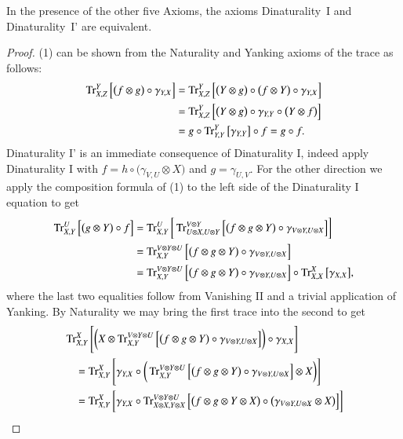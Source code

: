 \documentclass[12pt,oneside,article,draft]{memoir}
\begin{document}
\begin{enumerate}
{\begin{proposition}
\begin{enumerate}
\begin{description}
 \end{description}
 In the presence of the other five Axioms, the axioms Dinaturality~I and Dinaturality~I' are equivalent.
\end{enumerate}
\end{proposition}
\begin{proof}
 (1) can be shown from the Naturality and Yanking axioms of the trace as follows:
 \begin{align*}
  \operatorname{Tr}^Y_{X,Z}\Big[\big(f\otimes g\big)\circ\gamma_{Y,X}\Big]
  &=\operatorname{Tr}^Y_{X,Z}\Big[\big(Y\otimes g\big)\circ\big(f\otimes Y\big)\circ\gamma_{Y,X}\Big]\\
  &=\operatorname{Tr}^Y_{X,Z}\Big[\big(Y\otimes g\big)\circ\gamma_{Y,Y}\circ\big(Y\otimes f\big)\Big]\\
  &=g\circ\operatorname{Tr}^Y_{Y,Y}\big[\gamma_{Y,Y}\big]\circ f=g\circ f.
 \end{align*}
 Dinaturality I' is an immediate consequence of Dinaturality I, indeed apply Dinaturality I with $f=h\circ\big(\gamma_{V,U}\otimes X\big)$ and $g=\gamma_{U,V}$.
 For the other direction we apply the composition formula of (1) to the left side of the Dinaturality I equation to get
 \begin{align*}
  \operatorname{Tr}^U_{X,Y}\Big[\big(g\otimes Y\big)\circ f\Big]
  &=\operatorname{Tr}^U_{X,Y}\bigg[\operatorname{Tr}^{V\otimes Y}_{U\otimes X,U\otimes Y}\Big[\big(f\otimes g\otimes Y\big)\circ\gamma_{V\otimes Y,U\otimes X}\Big]\bigg]\\
 &=\operatorname{Tr}^{V\otimes Y\otimes U}_{X,Y}\Big[\big(f\otimes g\otimes Y\big)\circ\gamma_{V\otimes Y,U\otimes X}\Big]\\
  &=\operatorname{Tr}^{V\otimes Y\otimes U}_{X,Y}\Big[\big(f\otimes g\otimes Y\big)\circ\gamma_{V\otimes Y,U\otimes X}\Big]\circ\operatorname{Tr}^X_{X,X}\big[\gamma_{X,X}\big],
 \end{align*}
 where the last two equalities follow from Vanishing II and a trivial application of Yanking.  
 By Naturality we may bring the first trace into the second to get
 \begin{align*}
  &\Tr^X_{X,Y}\Bigg[\bigg(X\otimes \Tr^{V\otimes Y\otimes U}_{X,Y}\Big[\big(f\otimes g\otimes Y\big)\circ\gamma_{V\otimes Y,U\otimes X}\Big]\bigg)\circ\gamma_{X,X}\Bigg]\\
  &\quad=\Tr^X_{X,Y}\Bigg[\gamma_{Y,X}\circ\bigg(\Tr^{V\otimes Y\otimes U}_{X,Y}\Big[\big(f\otimes g\otimes Y\big)\circ\gamma_{V\otimes Y,U\otimes X}\Big]\otimes X\bigg)\Bigg]\\
  &\quad=\Tr^X_{X,Y}\bigg[\gamma_{Y,X}\circ\Tr^{V\otimes Y\otimes U}_{X\otimes X,Y\otimes X}\Big[\big(f\otimes g\otimes Y\otimes X\big)\circ\big(\gamma_{V\otimes Y,U\otimes X}\otimes X\big)\Big]\bigg]\\

\end{align*}
\end{proof}}
\end{enumerate}
\end{document}
